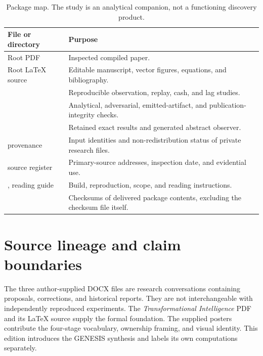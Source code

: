 \documentclass[11pt,letterpaper]{article}
\theoremstyle{remark}\newtheorem{remark}{Remark}[section]
\begin{document}
\begin{table}[htbp]
\caption{Package map. The study is an analytical companion, not a functioning discovery product.}
\begin{tabularx}{\linewidth}{P{5.0cm}Y}
\toprule
\textbf{File or directory}&\textbf{Purpose}\\\midrule
Root PDF&Inspected compiled paper.\\
Root LaTeX source&Editable manuscript, vector figures, equations, and bibliography.\\
&Reproducible observation, replay, cash, and lag studies.\\
&Analytical, adversarial, emitted-artifact, and publication-integrity checks.\\
&Retained exact results and generated abstract observer.\\
 provenance&Input identities and non-redistribution status of private research files.\\
 source register&Primary-source addresses, inspection date, and evidential use.\\
, reading guide&Build, reproduction, scope, and reading instructions.\\
&Checksums of delivered package contents, excluding the checksum file itself.\\\bottomrule
\end{tabularx}
\end{table}

\section{Source lineage and claim boundaries}
\label{app:source}
The three author-supplied DOCX files are research conversations containing proposals, corrections, and historical reports. They are not interchangeable with independently reproduced experiments. The \emph{Transformational Intelligence} PDF and its LaTeX source supply the formal foundation. The supplied posters contribute the four-stage vocabulary, ownership framing, and visual identity. This edition introduces the GENESIS synthesis and labels its own computations separately.
\end{document}

